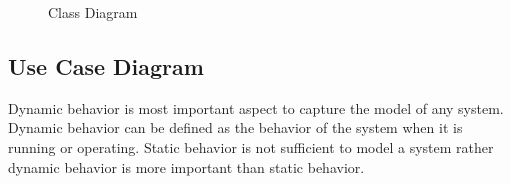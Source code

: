 \documentclass[oneside,a4paper,12pt]{report}
\begin{document}
\begin{center}
	\begin{figure}[!htbp]
		\centering
  	    \caption{Class Diagram}
	    \label{fig:Class Diagram}
	\end{figure}
\end{center}

\newpage
\subsection{Use Case Diagram}
\hspace*{0.5cm} Dynamic behavior is most important aspect to capture the model of any system. Dynamic behavior can be defined as the behavior of the system when it is running or operating. Static behavior is not sufficient to model a system rather dynamic behavior is more important than static behavior.
\end{document}
